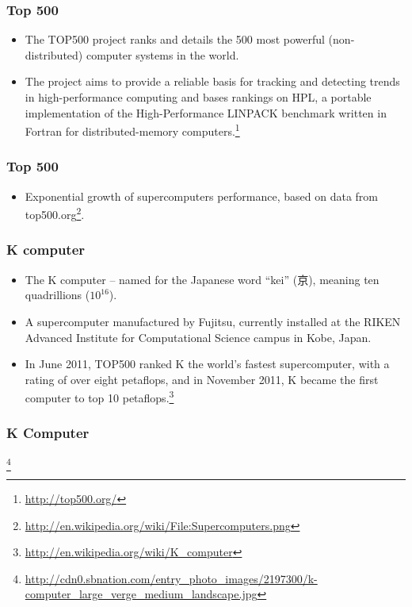 \documentclass{beamer}
\begin{document}
\begin{CJK}{UTF8}{bsmi}
\begin{frame}
\frametitle{Top 500}
\begin{itemize}
\item The TOP500 project ranks and details the 500 most powerful
  (non-distributed) computer systems in the world.
\item The project aims to provide a reliable basis for tracking and
  detecting trends in high-performance computing and bases rankings on
  HPL, a portable implementation of the High-Performance LINPACK
  benchmark written in Fortran for distributed-memory computers.\footnote{\url{http://top500.org/}}
\end{itemize}
\end{frame}

\begin{frame}
\frametitle{Top 500}
\centerline{}
\begin{itemize}
\item Exponential growth of supercomputers performance, based on data
  from top500.org\footnote{\url{http://en.wikipedia.org/wiki/File:Supercomputers.png}}.
\end{itemize}
\end{frame}

\begin{frame}
\frametitle{K computer}
\begin{itemize}
\item The K computer -- named for the Japanese word ``kei'' (京),
  meaning ten quadrillions ($10^{16}$).
\item A supercomputer manufactured by Fujitsu, currently installed at
  the RIKEN Advanced Institute for Computational Science campus in
  Kobe, Japan.
\item In June 2011, TOP500 ranked K the world's fastest supercomputer,
  with a rating of over eight petaflops, and in November 2011, K became
  the first computer to top 10 petaflops.\footnote{\url{http://en.wikipedia.org/wiki/K_computer}}
\end{itemize}
\end{frame}

\begin{frame}
\frametitle{K Computer}
\centerline{}
\footnote{\url{http://cdn0.sbnation.com/entry_photo_images/2197300/k-computer_large_verge_medium_landscape.jpg}}
\end{frame}


\end{CJK}
\end{document}
